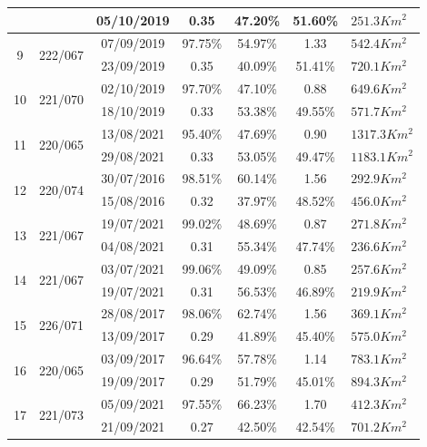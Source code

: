 \documentclass[cic,tc]{iiufrgs}
\begin{document}
\begin{table}[!htb]
\begin{tabular}{ccccccl}
                         &  & 05/10/2019 & 0.35 & 47.20\% & 51.60\% & $251.3Km^2$ \\
\hline
\multirow{2}{*}{9} & \multirow{2}{*}{222/067} & 07/09/2019 & 97.75\% & 54.97\% & 1.33 & $542.4Km^2$ \\
                         &  & 23/09/2019 & 0.35 & 40.09\% & 51.41\% & $720.1Km^2$ \\
\hline
\multirow{2}{*}{10} & \multirow{2}{*}{221/070} & 02/10/2019 & 97.70\% & 47.10\% & 0.88 & $649.6Km^2$ \\
                         &  & 18/10/2019 & 0.33 & 53.38\% & 49.55\% & $571.7Km^2$ \\
\hline
\multirow{2}{*}{11} & \multirow{2}{*}{220/065} & 13/08/2021 & 95.40\% & 47.69\% & 0.90 & $1317.3Km^2$ \\
                         &  & 29/08/2021 & 0.33 & 53.05\% & 49.47\% & $1183.1Km^2$ \\
\hline
\multirow{2}{*}{12} & \multirow{2}{*}{220/074} & 30/07/2016 & 98.51\% & 60.14\% & 1.56 & $292.9Km^2$ \\
                         &  & 15/08/2016 & 0.32 & 37.97\% & 48.52\% & $456.0Km^2$ \\
\hline
\multirow{2}{*}{13} & \multirow{2}{*}{221/067} & 19/07/2021 & 99.02\% & 48.69\% & 0.87 & $271.8Km^2$ \\
                         &  & 04/08/2021 & 0.31 & 55.34\% & 47.74\% & $236.6Km^2$ \\
\hline
\multirow{2}{*}{14} & \multirow{2}{*}{221/067} & 03/07/2021 & 99.06\% & 49.09\% & 0.85 & $257.6Km^2$ \\
                         &  & 19/07/2021 & 0.31 & 56.53\% & 46.89\% & $219.9Km^2$ \\
\hline
\multirow{2}{*}{15} & \multirow{2}{*}{226/071} & 28/08/2017 & 98.06\% & 62.74\% & 1.56 & $369.1Km^2$ \\
                         &  & 13/09/2017 & 0.29 & 41.89\% & 45.40\% & $575.0Km^2$ \\
\hline
\multirow{2}{*}{16} & \multirow{2}{*}{220/065} & 03/09/2017 & 96.64\% & 57.78\% & 1.14 & $783.1Km^2$ \\
                         &  & 19/09/2017 & 0.29 & 51.79\% & 45.01\% & $894.3Km^2$ \\
\hline
\multirow{2}{*}{17} & \multirow{2}{*}{221/073} & 05/09/2021 & 97.55\% & 66.23\% & 1.70 & $412.3Km^2$ \\
                         &  & 21/09/2021 & 0.27 & 42.50\% & 42.54\% & $701.2Km^2$ \\

\end{tabular}
\end{table}
\end{document}
